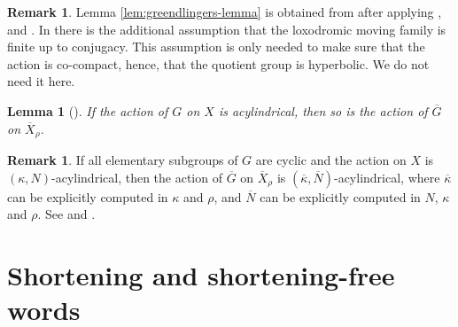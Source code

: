 \documentclass[leqno,a4paper,10pt]{amsart}
\theoremstyle{plain}
\newtheorem{lem}[thm]{Lemma}
\theoremstyle{definition}
\newtheorem{rem}[thm]{Remark}
\theoremstyle{remark}
\newcommand{\q}[1]{\overline{#1}}
\begin{document}
\begin{rem}
	Lemma \ref{lem:greendlingers-lemma} is obtained from \cite[Theorem~3.5]{coulon_detecting_2018} after applying \cite[Proposition~1.11]{coulon_detecting_2018}, \cite[Proposition~2.4 (2)]{coulon_geometry_2014} and \cite[Lemma~2.31]{coulon_geometry_2014}. In \cite[Theorem~3.5]{coulon_detecting_2018} there is the additional assumption that the loxodromic moving family is finite up to 
	conjugacy. This assumption is only needed to make sure that the action is co-compact, hence, that the quotient group is hyperbolic. We do not need it here.
\end{rem}

\begin{lem}[]
\label{lem:small-cancellation-acylindricity}
If the action of $G$ on $X$ is acylindrical, then so is the action of $\q G$ on $\q X_{\rho}$.
\end{lem}
\begin{rem}\label{rem:small-cancellation-acylindricity} If all elementary subgroups of $G$ are cyclic and the action on $X$ is $(\kappa,N)$-acylindrical, then the action of $\q G$ on $\q X_{\rho}$ is $(\overline{\kappa},\overline{N})$-acylindrical, where $\overline{\kappa}$ can be explicitly computed in $\kappa$ and $\rho$, and $\overline{N}$ can be explicitly computed in $N$, $\kappa$ and $\rho$. See \cite[Proof of Proposition~5.33]{dahmani_hyperbolically_2017} and \cite[Proposition 9.9]{coulon_product_2022}.
\end{rem}

\section{Shortening and shortening-free words}

\label{sec:shortening-shortening-free-words}
\end{document}
